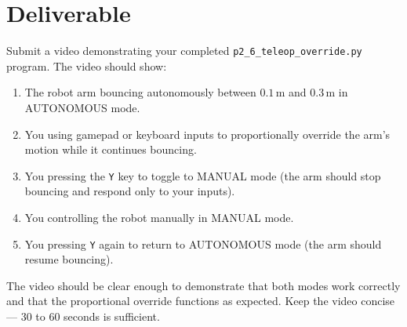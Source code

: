 \documentclass[11pt,a4paper]{article}
\begin{document}
\section*{Deliverable}

Submit a video demonstrating your completed \texttt{p2\_6\_teleop\_override.py} program. The video should show:

\begin{enumerate}
    \item The robot arm bouncing autonomously between $0.1\,\text{m}$ and $0.3\,\text{m}$ in AUTONOMOUS mode.
    \item You using gamepad or keyboard inputs to proportionally override the arm's motion while it continues bouncing.
    \item You pressing the \texttt{Y} key to toggle to MANUAL mode (the arm should stop bouncing and respond only to your inputs).
    \item You controlling the robot manually in MANUAL mode.
    \item You pressing \texttt{Y} again to return to AUTONOMOUS mode (the arm should resume bouncing).
\end{enumerate}

The video should be clear enough to demonstrate that both modes work correctly and that the proportional override functions as expected. Keep the video concise — 30 to 60 seconds is sufficient.
\end{document}
